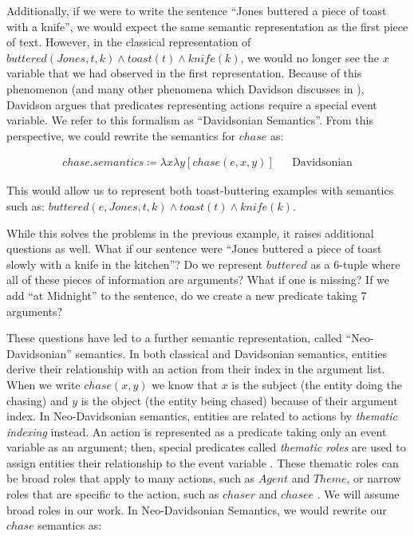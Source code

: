 \documentclass[11pt,a4paper]{article}
\begin{document}
Additionally, if we were to write the sentence ``Jones buttered a piece of toast
with a knife'',  we would expect the same semantic representation as the first
piece of text. However, in the classical representation of $buttered(Jones, t,
k) \land toast(t) \land knife(k)$, we would no longer see the $x$ variable that
we had observed in the first representation. Because of this phenomenon (and
many other phenomena which Davidson discusses in \cite{davidson1967logical}),
Davidson argues that predicates representing actions require a special event
variable. We refer to this formalism as ``Davidsonian Semantics''. From this
perspective, we could rewrite the semantics for $chase$ as:

\begin{align}
chase.semantics \coloneqq \lambda x \lambda y \left[ chase(e,x,y) \right] && \text{Davidsonian}
\end{align}

This would allow us to represent both toast-buttering examples with semantics
such as: $buttered(e, Jones, t, k) \land toast(t) \land knife(k)$.

While this solves the problems in the previous example, it raises additional
questions as well. What if our sentence were ``Jones buttered a piece of toast
slowly with a knife in the kitchen''? Do we represent $buttered$ as a 6-tuple
where all of these pieces of information are arguments? What if one is missing?
If we add ``at Midnight'' to the sentence, do we  create a new predicate taking
7 arguments?

These questions have led to a further semantic representation, called ``Neo-Davidsonian'' semantics. In both classical and Davidsonian semantics, entities
derive their relationship with an action from their index in the argument list.
When we write $chase(x,y)$ we know that $x$ is the subject (the entity doing the
chasing) and $y$ is the object (the entity being chased) because of their
argument index. In Neo-Davidsonian semantics, entities are related to actions by {\em thematic indexing} instead. An action is represented as a predicate taking only an event variable as an argument; then, special predicates called {\em thematic roles}
are used to assign entities their relationship to the event variable
\cite{neodavidsonian}. These thematic roles can be broad roles that apply to
many actions, such as $Agent$ and $Theme$, or narrow roles that are specific to
the action, such as $chaser$ and $chasee$ \cite{baker1997thematic}. We will
assume broad roles in our work. In Neo-Davidsonian Semantics, we would rewrite
our $chase$ semantics as:
\end{document}
